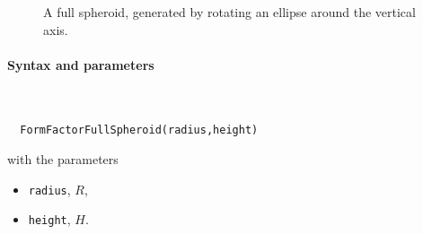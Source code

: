 \begin{figure}[H]
\hfill
{}
\hfill
{}
\hfill
{}
\hfill
\caption{A full spheroid, generated by rotating an ellipse around the vertical axis.}
\end{figure}

\FloatBarrier

\paragraph{Syntax and parameters}\strut\\[-2ex plus .2ex minus .2ex]
\begin{lstlisting}
  FormFactorFullSpheroid(radius,height)
\end{lstlisting}
with the parameters
\begin{itemize}
\item \texttt{radius}, $R$,
\item \texttt{height}, $H$.
\end{itemize}

